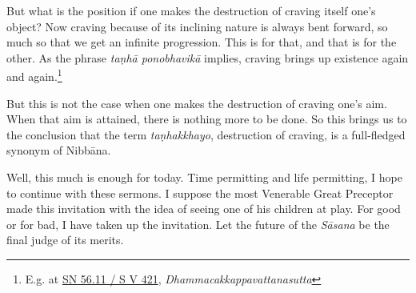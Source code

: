But what is the position if one makes the destruction of craving itself one's object? Now craving because of its inclining nature is always bent forward, so much so that we get an infinite progression. This is for that, and that is for the other. As the phrase \emph{taṇhā ponobhavikā} implies, craving brings up existence again and again.\footnote{E.g. at \href{https://suttacentral.net/sn56.11/pli/ms}{SN 56.11 / S V 421}, \emph{Dhammacakkappavattanasutta}}

But this is not the case when one makes the destruction of craving one's aim. When that aim is attained, there is nothing more to be done. So this brings us to the conclusion that the term \emph{taṇhakkhayo}, destruction of craving, is a full-fledged synonym of Nibbāna.

Well, this much is enough for today. Time permitting and life permitting, I hope to continue with these sermons. I suppose the most Venerable Great Preceptor made this invitation with the idea of seeing one of his children at play. For good or for bad, I have taken up the invitation. Let the future of the \emph{Sāsana} be the final judge of its merits.
